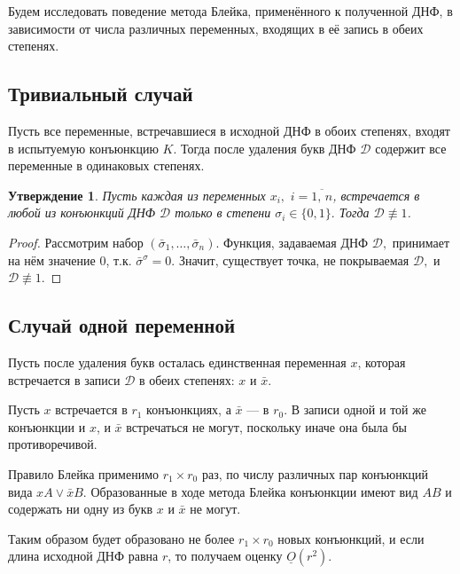 \documentclass[12pt,a4paper,oneside,fleqn,leqno]{article}
\newtheorem{statement}{Утверждение}
\theoremstyle{definition}
\begin{document}
		Будем исследовать поведение метода Блейка, применённого к полученной ДНФ, в зависимости от числа различных переменных, входящих в её запись в обеих степенях.\par
		\subsection{Тривиальный случай}
			Пусть все переменные, встречавшиеся в исходной ДНФ в обоих степенях, входят в испытуемую конъюнкцию $K.$ Тогда после удаления букв ДНФ $\mathcal{D}$ содержит все переменные в одинаковых степенях.\par
			\begin{statement}
				Пусть каждая из переменных $x_i,\,\,i = \overline{1,\,n}$, встречается в любой из конъюнкций ДНФ $\mathcal{D}$ только в степени $\sigma_i \in \{ 0, 1\}.$ Тогда $\mathcal{D} \not\equiv 1$.
			\end{statement}
			\begin{proof}
				Рассмотрим набор $(\bar{\sigma}_1, \ldots, \bar{\sigma}_n).$ Функция, задаваемая ДНФ $\mathcal{D},$ принимает на нём значение 0, т.к. $\bar{\sigma}^{\sigma} = 0.$ Значит, существует точка, не покрываемая $\mathcal{D},$ и $\mathcal{D} \not\equiv 1$.
			\end{proof}
		\subsection{Случай одной переменной}
			Пусть после удаления букв осталась единственная переменная $x$, которая встречается в записи $\mathcal{D}$ в обеих степенях: $x$ и $\bar{x}$.\par
			Пусть $x$ встречается в $r_1$ конъюнкциях, а $\bar{x}$ --- в $r_0.$ В записи одной и той же конъюнкции и $x$, и $\bar{x}$ встречаться не могут, поскольку иначе она была бы противоречивой.\par
			Правило Блейка применимо $r_1\times r_0$ раз, по числу различных пар конъюнкций вида $xA \vee \bar{x}B.$ Образованные в ходе метода Блейка конъюнкции имеют вид $AB$ и содержать ни одну из букв $x$ и $\bar{x}$ не могут.\par
			Таким образом будет образовано не более $r_1\times r_0$ новых конъюнкций, и если длина исходной ДНФ равна $r$, то получаем оценку $\underline{O}(r^2).$
\end{document}
